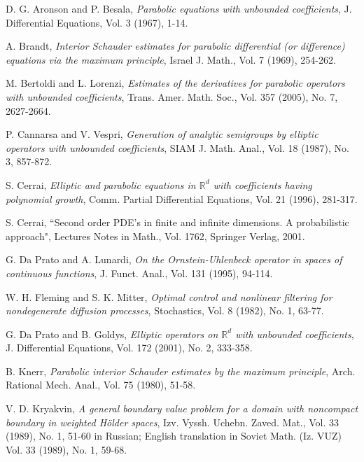 \documentclass[reqno,12pt]{amsart}
\theoremstyle{definition}
\theoremstyle{remark}
\begin{document}
\begin{thebibliography}{nn}

D. G. Aronson  and  P. Besala, {\em Parabolic equations with unbounded
coefficients\/}, J. Differential Equations, Vol. 3 (1967), 1-14.

  A.
Brandt, {\em Interior Schauder estimates for parabolic differential
(or difference) equations via the maximum principle\/}, Israel J.
Math., Vol. 7 (1969), 254-262.

 M. Bertoldi and L. Lorenzi,  
{\em Estimates of the
derivatives for parabolic operators with unbounded coefficients\/},
  Trans. Amer. Math. Soc., Vol.  357  (2005),  No. 7, 2627-2664.

 P.
Cannarsa and  V. Vespri, {\em Generation of analytic semigroups by
elliptic operators with unbounded coefficients\/}, SIAM J. Math.
Anal., Vol. 18  (1987),  No. 3, 857-872.

 S.
Cerrai,  {\em Elliptic and parabolic equations in ${\mathbb{R}}^d$ with
coefficients having polynomial growth\/},  Comm. Partial
Differential Equations,  Vol. 21  (1996), 281-317.

 S. Cerrai,   ``Second order PDE's  in finite and
infinite dimensions. A probabilistic approach",   Lectures Notes
in Math.,  Vol.  1762, Springer Verlag, 2001.

  G.  Da Prato   and A. Lunardi,  
{\em On the Ornstein-Uhlenbeck operator in spaces of continuous
functions\/}, J. Funct. Anal., Vol. 131  (1995), 94-114.

     W. H. Fleming  and S. K. Mitter,  
{\em Optimal control and nonlinear filtering for nondegenerate
diffusion processes\/}, Stochastics, Vol. 8 (1982), No. 1, 63-77.

 G. Da
Prato and  B. Goldys,   {\em Elliptic operators on ${\mathbb{R}}^d$ with
unbounded coefficients\/}, J. Differential Equations, Vol. 172
(2001), No. 2, 333-358.

  B.
Knerr, {\em Parabolic interior Schauder estimates by the maximum
principle\/}, Arch. Rational Mech. Anal., Vol. 75 (1980),  51-58.

 V. D.
Kryakvin,  
   {\em A general boundary value problem for a
    domain with noncompact boundary in weighted H\"older spaces\/},
    Izv. Vyssh. Uchebn. Zaved. Mat.,  
   Vol. 33 (1989),  No. 1, 51-60 in Russian; English
translation in  Soviet Math. (Iz. VUZ)
   Vol.   33  (1989),  No. 1, 59-68.


\end{thebibliography}
\end{document}
